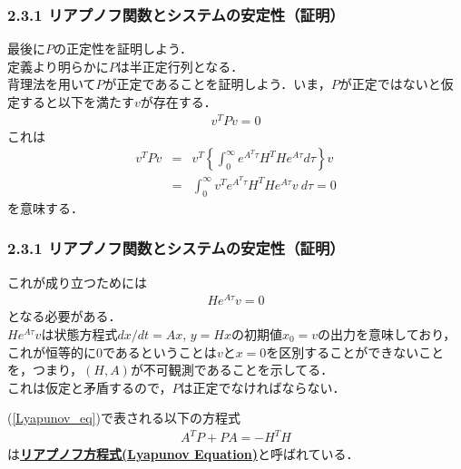 \begin{frame}[t]
\frametitle{2.3.1 リアプノフ関数とシステムの安定性（証明）}
最後に$P$の正定性を証明しよう．
\\[3mm]

定義より明らかに$P$は半正定行列となる．
\\[3mm]

背理法を用いて$P$が正定であることを証明しよう．いま，$P$が正定ではないと仮定すると以下を満たす$v$が存在する．
\begin{eqnarray}
	v^T P v = 0
\end{eqnarray}
これは
\begin{eqnarray}
	v^T P v & = & v^T \left \{ \int_0^\infty e^{A^T \tau} H^T H e^{A \tau} d \tau \right \} v
\nonumber \\
	& = &  \int_0^\infty v^T e^{A^T \tau} H^T H e^{A \tau} v \ d \tau = 0
\end{eqnarray}
を意味する．
\end{frame}

\begin{frame}[t]
\frametitle{2.3.1 リアプノフ関数とシステムの安定性（証明）}
これが成り立つためには
\begin{eqnarray}
	H e^{A \tau} v = 0
\end{eqnarray}
となる必要がある．
\\[3mm]

$H e^{A \tau} v$は状態方程式$dx/dt = Ax$, $y = H x$の初期値$x_0=v$の出力を意味しており，これが恒等的に$0$であるということは$v$と$x=0$を区別することができないことを，つまり，$(H,A)$が不可観測であることを示してる．
\\[3mm]

これは仮定と矛盾するので，$P$は正定でなければならない．

(\ref{Lyapunov_eq})で表される以下の方程式
\begin{eqnarray}
	A^T P + P A = - H^T H
\label{Lyapunov_eq2}
\end{eqnarray}
は{\bf \underline{リアプノフ方程式(Lyapunov Equation)}}と呼ばれている．


\end{frame}

